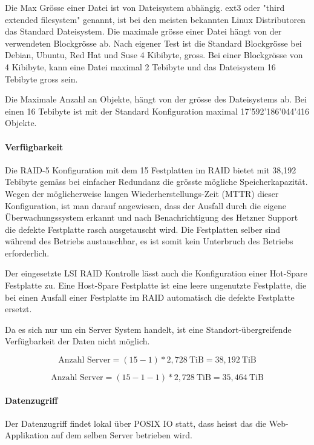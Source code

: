 Die Max Grösse einer Datei ist von Dateisystem abhängig. ext3 oder "third extended filesystem" genannt, ist bei den meisten bekannten Linux Distributoren das Standard Dateisystem. Die maximale grösse einer Datei hängt von der verwendeten Blockgrösse ab. Nach eigener Test ist die Standard Blockgrösse bei Debian, Ubuntu, Red Hat und Suse 4 Kibibyte, gross. Bei einer Blockgrösse von 4 Kibibyte, kann eine Datei maximal 2 Tebibyte und das Dateisystem 16 Tebibyte gross sein. \cite{Card1993}

Die Maximale Anzahl an Objekte, hängt von der grösse des Dateisystems ab. Bei einen 16 Tebibyte ist mit der Standard Konfiguration maximal 17'592'186'044'416 Objekte. 

\paragraph*{Verfügbarkeit}
Die RAID-5 Konfiguration mit dem 15 Festplatten im RAID bietet mit 38,192 Tebibyte gemäss  bei einfacher Redundanz die grösste mögliche Speicherkapazität. Wegen der möglicherweise langen Wiederherstellungs-Zeit (MTTR) dieser Konfiguration, ist man darauf angewiesen, dass der Ausfall durch die eigene Überwachungssystem erkannt und nach Benachrichtigung des Hetzner Support die defekte Festplatte rasch ausgetauscht wird. Die Festplatten selber sind während des Betriebs austauschbar, es ist somit kein Unterbruch des Betriebs erforderlich.

Der eingesetzte LSI RAID Kontrolle lässt auch die Konfiguration einer Hot-Spare Festplatte zu. Eine Host-Spare Festplatte ist eine leere ungenutzte Festplatte, die bei einen Ausfall einer Festplatte im RAID automatisch die defekte Festplatte ersetzt. 

Da es sich nur um ein Server System handelt, ist eine Standort-übergreifende Verfügbarkeit der Daten nicht möglich.


\begin{equation}
\mbox{Anzahl Server} = (15 -1)* 2,728 \mathrm{\ TiB}=  38,192 \mathrm{\ TiB}
\label{eqn:MaxSpeicherkapazitätHeztner}
\end{equation}

\begin{equation}
\mbox{Anzahl Server} = (15 -1-1)* 2,728 \mathrm{\ TiB}=  35,464 \mathrm{\ TiB}
\label{eqn:MaxSpeicherkapazitätHeztnerHotspare}
\end{equation}

\paragraph*{Datenzugriff}
Der Datenzugriff findet lokal über POSIX IO statt, dass heisst das die Web-Applikation auf dem selben Server betrieben wird. 

